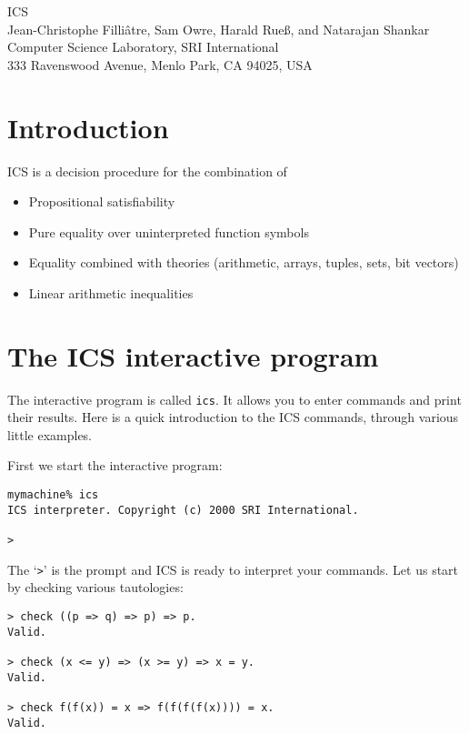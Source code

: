 \documentclass[12pt]{article}
\begin{document}
\thispagestyle{empty}
\vspace*{4cm}
\begin{center}
   {\Huge\sf ICS} 
   \\[3cm]
   {\large\sf Jean-Christophe Filli\^atre, Sam Owre, Harald Rue\ss, 
   and Natarajan Shankar}
   \\[3cm]
  Computer Science Laboratory, SRI International \\
  333 Ravenswood Avenue, Menlo Park, CA 94025, USA
\end{center}
\vfill\newpage


\section*{Introduction}

ICS is a decision procedure for the combination of 
\begin{itemize}
\item Propositional satisfiability
\item Pure equality over uninterpreted function symbols
\item Equality combined with theories (arithmetic, arrays, tuples,
  sets, bit vectors)
\item Linear arithmetic inequalities
\end{itemize}


\section{The ICS interactive program}

The interactive program is called \texttt{ics}.
It allows you to enter commands and print their results.
Here is a quick introduction to the ICS commands, through various
little examples.

First we start the interactive program:
\begin{verbatim}
mymachine% ics
ICS interpreter. Copyright (c) 2000 SRI International.

> 
\end{verbatim}
The `\texttt{>}' is the prompt and ICS is ready to interpret your commands.
Let us start by checking various tautologies:
\begin{verbatim}
> check ((p => q) => p) => p.
Valid.

> check (x <= y) => (x >= y) => x = y.
Valid.

> check f(f(x)) = x => f(f(f(f(x)))) = x. 
Valid.
\end{verbatim}
\end{document}
